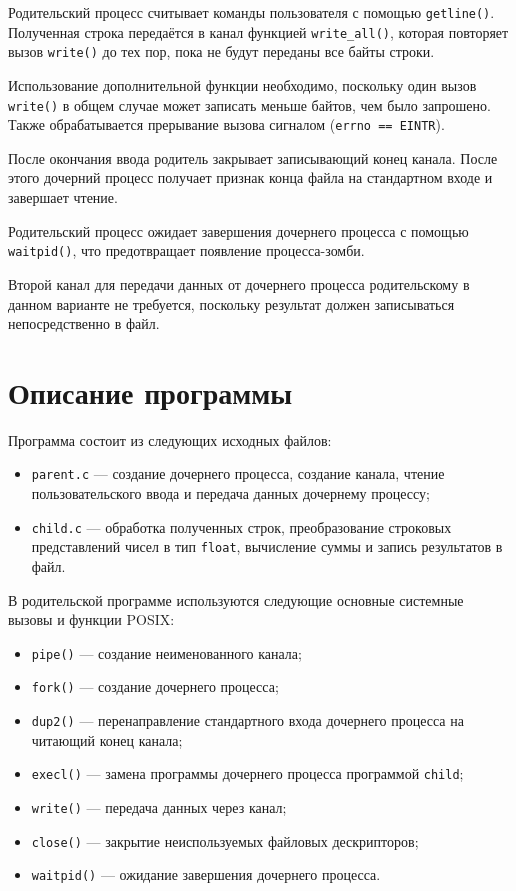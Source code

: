 Родительский процесс считывает команды пользователя с помощью
\texttt{getline()}. Полученная строка передаётся в канал функцией
\texttt{write\_all()}, которая повторяет вызов \texttt{write()} до тех
пор, пока не будут переданы все байты строки.

Использование дополнительной функции необходимо, поскольку один вызов
\texttt{write()} в общем случае может записать меньше байтов, чем было
запрошено. Также обрабатывается прерывание вызова сигналом
(\texttt{errno == EINTR}).

После окончания ввода родитель закрывает записывающий конец канала.
После этого дочерний процесс получает признак конца файла на стандартном
входе и завершает чтение.

Родительский процесс ожидает завершения дочернего процесса с помощью
\texttt{waitpid()}, что предотвращает появление процесса-зомби.

Второй канал для передачи данных от дочернего процесса родительскому в
данном варианте не требуется, поскольку результат должен записываться
непосредственно в файл.

\section{Описание программы}

Программа состоит из следующих исходных файлов:

\begin{itemize}
    \item \texttt{parent.c} --- создание дочернего процесса, создание
    канала, чтение пользовательского ввода и передача данных дочернему
    процессу;

    \item \texttt{child.c} --- обработка полученных строк, преобразование
    строковых представлений чисел в тип \texttt{float}, вычисление суммы
    и запись результатов в файл.
\end{itemize}

В родительской программе используются следующие основные системные
вызовы и функции POSIX:

\begin{itemize}
    \item \texttt{pipe()} --- создание неименованного канала;
    \item \texttt{fork()} --- создание дочернего процесса;
    \item \texttt{dup2()} --- перенаправление стандартного входа
    дочернего процесса на читающий конец канала;
    \item \texttt{execl()} --- замена программы дочернего процесса
    программой \texttt{child};
    \item \texttt{write()} --- передача данных через канал;
    \item \texttt{close()} --- закрытие неиспользуемых файловых
    дескрипторов;
    \item \texttt{waitpid()} --- ожидание завершения дочернего процесса.
\end{itemize}

